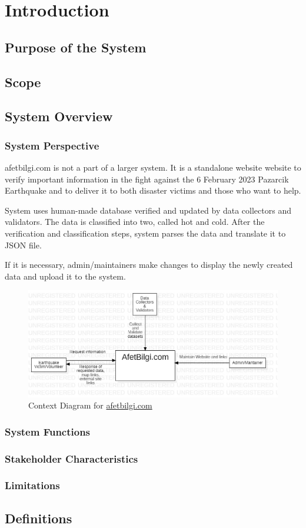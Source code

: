 \section{Introduction}

\subsection{Purpose of the System}

\subsection{Scope}

\subsection{System Overview}

\subsubsection{System Perspective}

afetbilgi.com is not a part of a larger system. It is a standalone website website to verify important information in the fight against the 6 February 2023 Pazarcik Earthquake and to deliver it to both disaster victims and those who want to help.

System uses human-made database verified and updated by data collectors and validators. The data is classified into two, called hot and cold. After the verification and classification steps, system parses the data and translate it to JSON file.

If it is necessary, admin/maintainers make changes to display the newly created data and upload it to the system.

\begin{figure}[H]
  \centering
  \includegraphics[width=\textwidth]{img/context-diagram.jpg}
  \caption{Context Diagram for \href{https://afetbilgi.com}{afetbilgi.com}}
\end{figure}

\subsubsection{System Functions}

\subsubsection{Stakeholder Characteristics}

\subsubsection{Limitations}

\subsection{Definitions}
